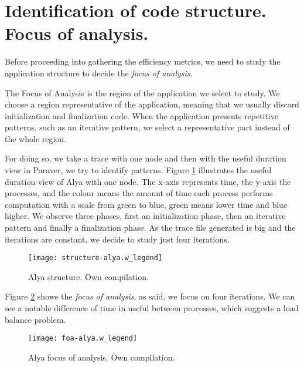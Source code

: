 \section{Identification of code structure. Focus of analysis.}

Before proceeding into gathering the efficiency metrics, we need to study the application structure to decide the \textit{focus of analysis}.

The Focus of Analysis is the region of the application we select to study. We choose a region representative of the application, meaning that we usually discard initialization and finalization code. When the application presents repetitive patterns, such as an iterative pattern, we select a representative part instead of the whole region.

For doing so, we take a trace with one node and then with the useful duration view in Paraver, we try to identify patterns. Figure \ref{alyastructure} illustrates the useful duration view of Alya with one node. The x-axis represents time, the y-axis the processes, and the colour means the amount of time each process performs computation with a scale from green to blue, green means lower time and blue higher. We observe three phases, first an initialization phase, then an iterative pattern and finally a finalization phase. As the trace file generated is big and the iterations are constant, we decide to study just four iterations.

\begin{figure}[h]
  \centering
  \texttt{[image: structure-alya.w\_legend]}
  \caption[Alya structure]{Alya structure. Own compilation.}
  \label{alyastructure}
\end{figure}

Figure \ref{alyafoa} shows the \textit{focus of analysis}, as said, we focus on four iterations. We can see a notable difference of time in useful between processes, which suggests a load balance problem.

\begin{figure}[h]
  \centering
  \texttt{[image: foa-alya.w\_legend]}
  \caption[Alya focus of analysis]{Alya focus of analysis. Own compilation.}
  \label{alyafoa}
\end{figure}


